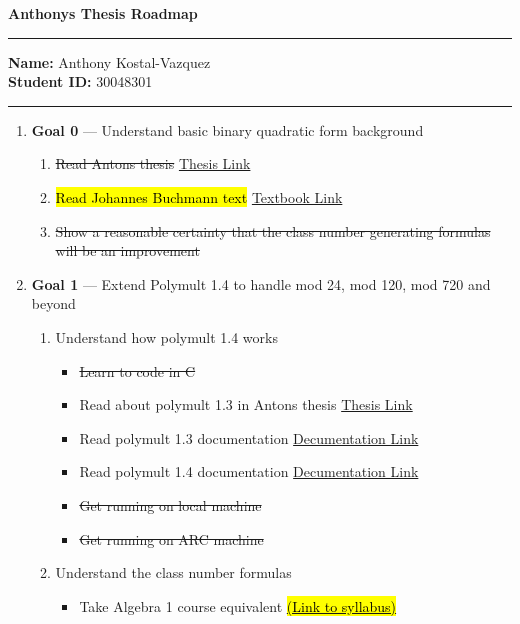 \documentclass[11pt]{article}
\theoremstyle{definition}
\begin{document}
\begin{center}
{\bf \Large Anthonys Thesis Roadmap}
\end{center}

\hrule 	

\textbf{Name:} Anthony Kostal-Vazquez \\
\textbf{Student ID:} 30048301

\medskip \hrule

\begin{enumerate}[leftmargin=\parindent,align=left,labelwidth=\parindent,labelsep=0pt]

\item[] \textbf{Goal 0} --- Understand basic binary quadratic form background

\begin{enumerate}
    \item \st{Read Antons thesis} \href{Antons thesis.pdf}{Thesis Link}
    \item \hl{Read Johannes Buchmann text} \href{Buchmann Algorithmic Approach to Binary Quadratic Forms.pdf}{Textbook Link}
    \item \st{Show a reasonable certainty that the class number generating formulas will be an improvement}
\end{enumerate}



\item[] \textbf{Goal 1} --- Extend Polymult 1.4 to handle mod 24, mod 120, mod 720 and beyond

\begin{enumerate}
    \item{Understand how polymult 1.4 works}
    \begin{itemize}
        \item \st{Learn to code in C}
        \item Read about polymult 1.3 in Antons thesis \href{Antons thesis.pdf}{Thesis Link}
        \item Read polymult 1.3 documentation \href{polymult-1.3.pdf}{Decumentation Link}
        \item Read polymult 1.4 documentation \href{jacobson_mosunov_-_tabulation.pdf}{Decumentation Link}
        \item \st{Get running on local machine}
        \item \st{Get running on ARC machine}
    \end{itemize}

    \item{Understand the class number formulas}
    \begin{itemize}
        \item Take Algebra 1 course equivalent \href{Syllabus _ Algebra I _ Mathematics _ MIT OpenCourseWare.pdf}{\hl{(Link to syllabus)}}
        

\end{itemize}
\end{enumerate}
\end{enumerate}
\end{document}
